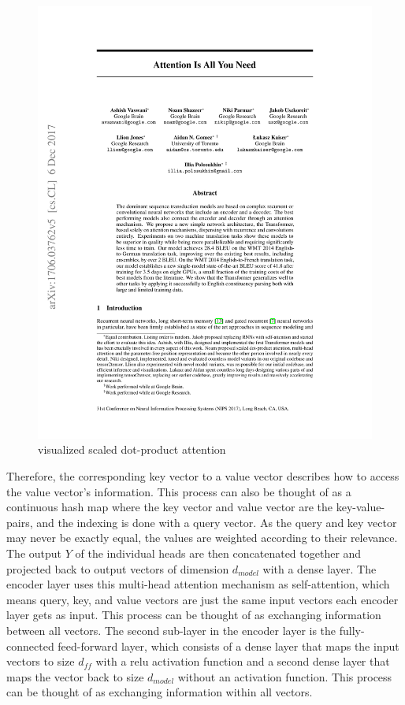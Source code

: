 \documentclass[draft,final]{vutinfth} %
\begin{document}
\begin{figure}[H]
\centering{}
\includegraphics[page=4,width=0.8\linewidth,trim={140 552 145 72},clip]{literature/attention_is_all_you_need.pdf}
\caption{visualized scaled dot-product attention \cite[p. 4]{Transformer}}
\label{fig:sdpa_vis}
\end{figure}
Therefore, the corresponding key vector to a value vector describes how to access the value vector's information.
This process can also be thought of as a continuous hash map where the key vector and value vector are the key-value-pairs, and the indexing is done with a query vector.
As the query and key vector may never be exactly equal, the values are weighted according to their relevance.
The output $Y$ of the individual heads are then concatenated together and projected back to output vectors of dimension $d_{model}$ with a dense layer.
The encoder layer uses this multi-head attention mechanism as self-attention, which means query, key, and value vectors are just the same input vectors each encoder layer gets as input.
This process can be thought of as exchanging information between all vectors.
The second sub-layer in the encoder layer is the fully-connected feed-forward layer, which consists of a dense layer that maps the input vectors to size $d_{ff}$ with a relu activation function and a second dense layer that maps the vector back to size $d_{model}$ without an activation function.
This process can be thought of as exchanging information within all vectors.
\end{document}

